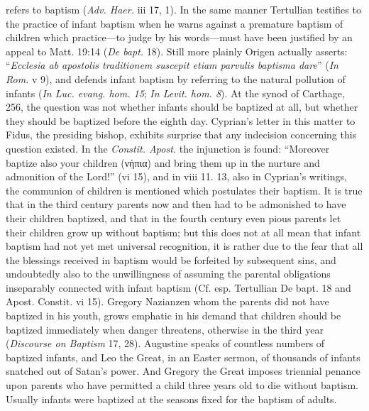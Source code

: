 refers to baptism (\emph{Adv. Haer.} iii 17, 1). In the same manner Tertullian testifies to the practice of infant baptism when he warns against a premature baptism of children which practice—to judge by his words—must have been justified by an appeal to Matt. 19:14 (\emph{De bapt.} 18). Still more plainly Origen actually asserts: “\emph{Ecclesia ab apostolis traditionem suscepit etiam parvulis baptisma dare}” (\emph{In Rom.} v 9), and defends infant baptism by referring to the natural pollution of infants (\emph{In Luc. evang. hom. 15}; \emph{In Levit. hom. 8}). At the synod of Carthage, 256, the question was not whether infants should be baptized at all, but whether they should be baptized before the eighth day. Cyprian’s letter in this matter to Fidus, the presiding bishop, exhibits surprise that any indecision concerning this question existed. In the \emph{Constit. Apost.} the injunction is found: “Moreover baptize also your children (νήπια) and bring them up in the nurture and admonition of the Lord!” (vi 15), and in viii 11. 13, also in Cyprian’s writings, the communion of children is mentioned which postulates their baptism. It is true that in the third century parents now and then had to be admonished to have their children baptized, and that in the fourth century even pious parents let their children grow up without baptism; but this does not at all mean that infant baptism had not yet met universal recognition, it is rather due to the fear that all the blessings received in baptism would be forfeited by subsequent sins, and undoubtedly also to the unwillingness of assuming the parental obligations inseparably connected with infant baptism (Cf. esp. Tertullian De bapt. 18 and Apost. Constit. vi 15). Gregory Nazianzen whom the parents did not have baptized in his youth, grows emphatic in his demand that children should be baptized immediately when danger threatens, otherwise in the third year (\emph{Discourse on Baptism} 17, 28). Augustine speaks of countless numbers of baptized infants, and Leo the Great, in an Easter sermon, of thousands of infants
snatched out of Satan’s power. And Gregory the Great imposes triennial penance upon parents who have permitted a child three years old to die without baptism. Usually infants were baptized at the seasons fixed for the baptism of adults.

